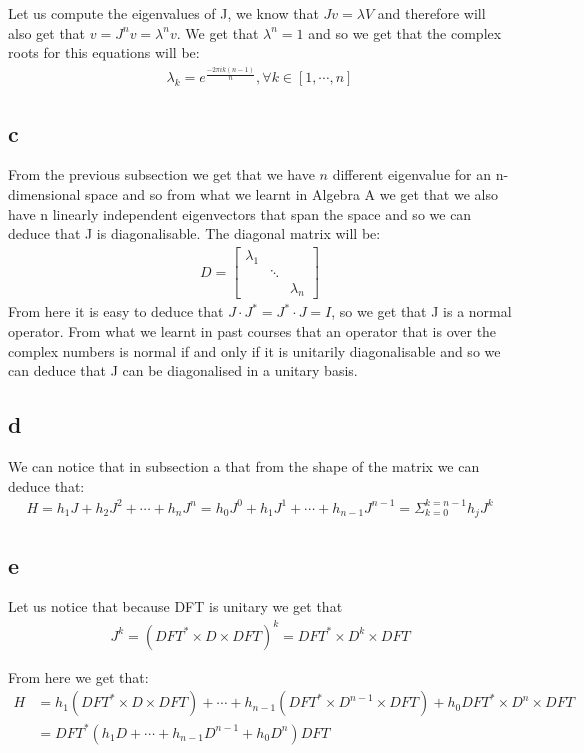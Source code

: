 \documentclass[english]{extarticle}
\numberwithin{equation}{section}
\numberwithin{figure}{section}
\begin{document}
Let us compute the eigenvalues of J, we know that $Jv = \lambda V$ and therefore will also get that $v = J^{n}v =\lambda^{n}v$. We get that $\lambda^{n} = 1$ and so we get that the complex roots for this equations will be:
\begin{align}
    \lambda_{k} = e^{\frac{-2 \pi i k (n-1)}{n}} , \forall k \in [1,\cdots, n]
\end{align}
\subsection*{c}
From the previous subsection we get that we have $n$ different eigenvalue for an n-dimensional space and so from what we learnt in Algebra A we get that we also have n linearly independent eigenvectors that span the space and so we can deduce that J is diagonalisable. The diagonal matrix will be:
\begin{align}
  D =
  \begin{bmatrix}
    \lambda_{1} & & \\
    & \ddots & \\
    & & \lambda_{n}
  \end{bmatrix}
\end{align}
From here it is easy to deduce that $J \cdot J^* = J^* \cdot J = I$, so we get that J is a normal operator. From what we learnt in past courses that an operator that is over the complex numbers is normal if and only if it is unitarily diagonalisable and so we can deduce that J can be diagonalised in a unitary basis.
\subsection*{d}
We can notice that in subsection a that from the shape of the matrix we can deduce that:
\begin{align}
    H = h_{1}J+h_{2}J^{2}+ \cdots + h_{n}J^{n} = h_{0}J^{0}+h_{1}J^{1}+ \cdots + h_{n-1}J^{n-1}  = \Sigma_{k=0}^{k=n-1}h_{j}J^{k}
\end{align}
\subsection*{e}
Let us notice that because DFT is unitary we get that
\begin{align}
    J^{k} = (DFT^{*} \times D \times DFT)^{k} = DFT^{*} \times D^{k} \times DFT
\end{align}

From here we get that:
\begin{align}
    H &= h_{1}( DFT^{*} \times D \times DFT) + \cdots + h_{n-1}( DFT^{*} \times D^{n-1} \times DFT) +h_{0} DFT^{*} \times D^{n} \times DFT \nonumber \\[2ex] 
    &= DFT^{*}(h_{1}D + \cdots + h_{n-1}D^{n-1}+h_{0}D^{n})DFT
\end{align}
\end{document}
